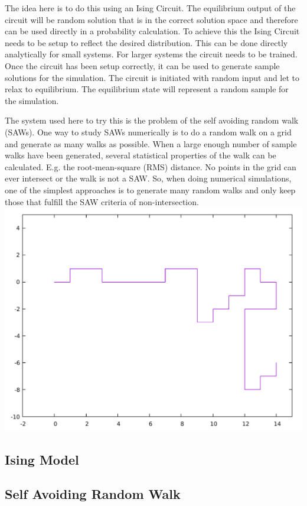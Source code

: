 \documentclass[11pt]{article}
\begin{document}
The idea here is to do this using an Ising Circuit. The equilibrium output of the circuit will be random solution that is in the correct solution space and therefore can be used directly in a probability calculation. To achieve this the Ising Circuit needs to be setup to reflect the desired distribution. This can be done directly analytically for small systems. For larger systems the circuit needs to be trained. Once the circuit has been setup correctly, it can be used to generate sample solutions for the simulation. The circuit is initiated with random input and let to relax to equilibrium. The equilibrium state will represent a random sample for the simulation.

The system used here to try this is the problem of the self avoiding random walk (SAWs). One way to study SAWs numerically is to do a random walk on a grid and generate as many walks as possible. When a large enough number of sample walks have been generated, several statistical properties of the walk can be calculated. E.g. the root-mean-square (RMS) distance. No points in the grid can ever intersect or the walk is not a SAW. So, when doing numerical simulations, one of the simplest approaches is to generate many random walks and only keep those that fulfill the SAW criteria of non-intersection.
\includegraphics[scale=0.25]{images/saw_example.pdf}
\subsection{Ising Model}
\subsection{Self Avoiding Random Walk}
\end{document}
